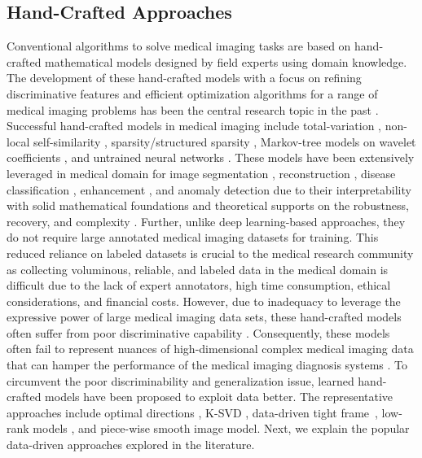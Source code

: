 \documentclass[10pt,journal,compsoc]{IEEEtran}
\begin{document}
\subsection{Hand-Crafted Approaches}
Conventional algorithms to solve medical imaging tasks are based on hand-crafted mathematical models designed by field experts using domain knowledge.
The development of these hand-crafted models with a focus on refining discriminative features and efficient optimization algorithms for a range of medical imaging problems has been the central research topic in the past \cite{suetens2017fundamentals,zhang2008medical}. Successful hand-crafted models in medical imaging include total-variation \cite{rudin1992nonlinear}, non-local self-similarity \cite{xu2015patch}, sparsity/structured sparsity \cite{eldar2012compressed}, Markov-tree models on wavelet coefficients \cite{choi2000hidden}, and untrained neural networks \cite{ulyanov2018deep,qayyum2021untrained,qayyum2020single}.
These models have been extensively leveraged in medical domain for image segmentation \cite{ramesh2021review}, reconstruction \cite{ravishankar2019image}, disease classification \cite{miranda2016survey}, enhancement \cite{jawdekar2021review}, and anomaly detection \cite{tschuchnig2021anomaly} due to their interpretability with solid mathematical foundations and theoretical supports on the robustness, recovery, and complexity \cite{ruping2006learning,ahmad2018interpretable}. Further, unlike deep learning-based approaches, they do not require large annotated medical imaging datasets for training. This reduced reliance on labeled datasets 
is crucial to the medical research community as collecting voluminous, reliable, and labeled data in the medical domain is difficult due to the lack of expert annotators, high time consumption, ethical considerations, and financial costs. 
However, due to inadequacy to leverage the expressive power of large medical imaging data sets, these hand-crafted models often suffer from poor discriminative capability \cite{zhou2021review}. Consequently, these models often fail to represent nuances of high-dimensional complex medical imaging data that can hamper the performance of the medical imaging diagnosis systems \cite{hegde2018algorithmic,lin2020comparison}. To circumvent the poor discriminability and generalization issue, learned hand-crafted models have been proposed to exploit data better.
The representative approaches include %
optimal directions \cite{engan1999method}, K-SVD \cite{aharon2006k}, data-driven tight frame~\cite{cai2014data}, low-rank models \cite{zhou2014low}, and piece-wise smooth image model\cite{an2007gamma}. Next, we explain the popular data-driven approaches explored in the literature. 
\end{document}

